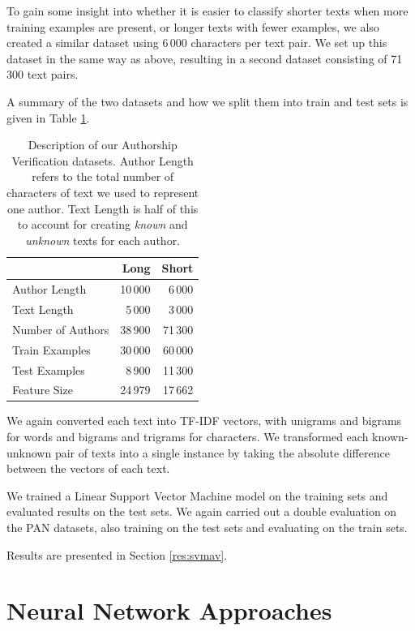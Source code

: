 To gain some insight into whether it is easier to classify shorter texts when more training examples are present, or longer texts with fewer examples, we also created a similar dataset using 6\,000 characters per text pair. We set up this dataset in the same way as above, resulting in a second dataset consisting of 71\,300 text pairs.

A summary of the two datasets and how we split them into train and test sets is given in Table \ref{verdata-table}.

\begin{table}[ht]
\caption{\label{verdata-table} Description of our Authorship Verification datasets. Author Length refers to the total number of characters of text we used to represent one author. Text Length is half of this to account for creating \textit{known} and \textit{unknown} texts for each author.}
\begin{center}
\begin{tabular}{lrr}
\toprule
& \bf Long & \bf Short \\
\midrule
Author Length & 10\,000 & 6\,000 \\
Text Length & 5\,000 & 3\,000 \\
Number of Authors & 38\,900 & 71\,300 \\
Train Examples & 30\,000 & 60\,000 \\
Test Examples & 8\,900 & 11\,300 \\
Feature Size & 24\,979 & 17\,662 \\
\bottomrule
\end{tabular}
\end{center}
\end{table}

\noindent We again converted each text into TF-IDF vectors, with unigrams and bigrams for words and bigrams and trigrams for characters. We transformed each known-unknown pair of texts into a single instance by taking the absolute difference between the vectors of each text.

We trained a Linear Support Vector Machine model on the training sets and evaluated results on the test sets. We again carried out a double evaluation on the PAN datasets, also training on the test sets and evaluating on the train sets.

Results are presented in Section \ref{res:svmav}.

\section{Neural Network Approaches}

